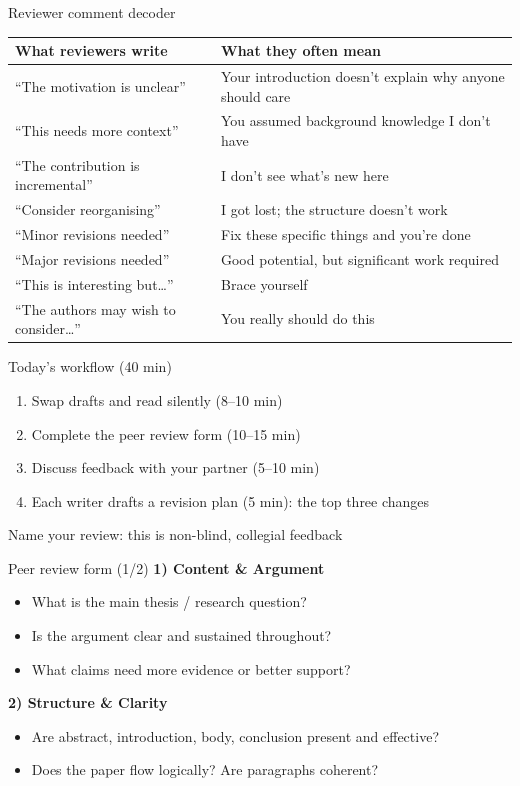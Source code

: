 \documentclass[aspectratio=169]{beamer}
\begin{document}
\begin{frame}{Reviewer comment decoder}
\small
\begin{tabular}{p{}p{}}
\textbf{What reviewers write} & \textbf{What they often mean} \\
\midrule
\addlinespace
``The motivation is unclear'' & Your introduction doesn't explain why anyone should care \\
``This needs more context'' & You assumed background knowledge I don't have \\
``The contribution is incremental'' & I don't see what's new here \\
``Consider reorganising'' & I got lost; the structure doesn't work \\
``Minor revisions needed'' & Fix these specific things and you're done \\
``Major revisions needed'' & Good potential, but significant work required \\
``This is interesting but\ldots'' & Brace yourself \\
``The authors may wish to consider\ldots'' & You really should do this \\
\end{tabular}
\end{frame}

\begin{frame}{Today's workflow (40 min)}
\begin{enumerate}
  \item Swap drafts and read silently (8–10 min)
  \item Complete the peer review form (10–15 min)
  \item Discuss feedback with your partner (5–10 min)
  \item Each writer drafts a revision plan (5 min): the top three changes
\end{enumerate}
Name your review: this is non-blind, collegial feedback
\end{frame}

\begin{frame}{Peer review form (1/2)}
\small
\textbf{1) Content \& Argument}
\begin{itemize}
  \item What is the main thesis / research question?
  \item Is the argument clear and sustained throughout?
  \item What claims need more evidence or better support?
\end{itemize}
\medskip
\textbf{2) Structure \& Clarity}
\begin{itemize}
  \item Are abstract, introduction, body, conclusion present and effective?
  \item Does the paper flow logically? Are paragraphs coherent?
\end{itemize}
\end{frame}
\end{document}
